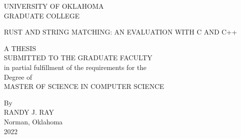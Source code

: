 \thispagestyle{empty}
\begin{center}
UNIVERSITY OF OKLAHOMA \\
\medskip
GRADUATE COLLEGE \\

\vspace{2.0in}

RUST AND STRING MATCHING: AN EVALUATION WITH C AND C++  \\

\vspace{2.0in}

A THESIS \\
\medskip
SUBMITTED TO THE GRADUATE FACULTY \\
\medskip
in partial fulfillment of the requirements for the \\
\medskip
Degree of \\
\medskip
MASTER OF SCIENCE IN COMPUTER SCIENCE \\

\mbox{}
\vfill

By \\
\medskip
RANDY J. RAY \\
Norman, Oklahoma \\
2022 \\
\end{center}
\pagebreak

